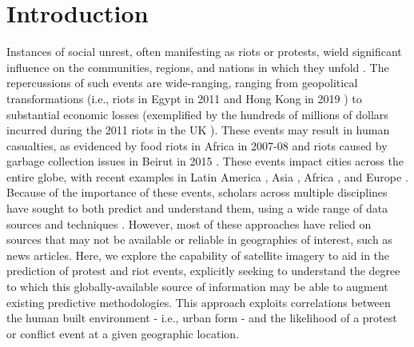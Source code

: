 
\chapter{Introduction} %

\label{Chapter1} %





Instances of social unrest, often manifesting as riots or protests, 
wield significant influence on the communities, regions, and nations 
in which they unfold \citep{bencsik2018non}.  The repercussions of such events are wide-ranging, ranging from geopolitical transformations (i.e., riots in Egypt in 2011 \citep{joya2011egyptian} and Hong Kong in 2019 \citep{purbrick2019report}) to substantial economic losses (exemplified by the hundreds of millions of dollars incurred during the 2011 riots in the UK \citep{bencsik2018non}).  These events may result in human casualties, as evidenced by food riots in Africa in 2007-08 \citep{berazneva2013explaining} and riots caused by garbage collection issues in Beirut in 2015 \citep{el2019riots}.  These events impact cities across the entire globe, with recent examples in Latin America \citep{eckstein2001power}, Asia \citep{purbrick2019report}, Africa \citep{joya2011egyptian, berazneva2013explaining}, and Europe \citep{andronikidou2012cultures}.  Because of the importance of these events, scholars across multiple disciplines have sought to both predict and understand them, using a wide range of data sources and techniques \citep{pond2019riots, snow2007framing, davies2013mathematical}.  However, most of these approaches have relied on sources that may not be available or reliable in geographies of interest, such as news articles.  Here, we explore the capability of satellite imagery to aid in the prediction of protest and riot events, explicitly seeking to understand the degree to which this globally-available source of information may be able to augment existing predictive methodologies. This approach exploits correlations between the human built environment - i.e., urban form \citep{fox2016urban} - and the likelihood of a protest or conflict event at a given geographic location.


